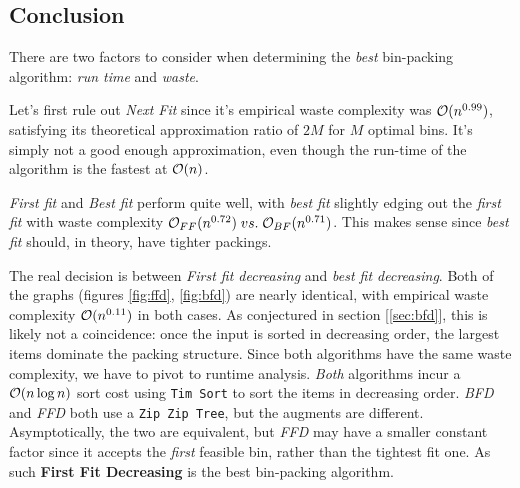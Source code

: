 \subsection{Conclusion}\label{sec:conc}

There are two factors to consider when determining the \emph{best} bin-packing
algorithm: \emph{run time} and \emph{waste}.

Let's first rule out \emph{Next Fit} since it's empirical waste complexity
was $\mathcal{O}(n^{0.99})$, satisfying its theoretical approximation ratio of $2M$ for
$M$ optimal bins. It's simply not a good enough approximation, even though the
run-time of the algorithm is the fastest at $\mathcal{O}(n)$.

\emph{First fit} and \emph{Best fit} perform quite well, with \emph{best fit}
slightly edging out the \emph{first fit} with waste complexity
$\mathcal{O}_{FF}(n^{0.72}) \; vs. \; \mathcal{O}_{BF}(n^{0.71})$. This makes sense since
\emph{best fit} should, in theory, have tighter packings.

The real decision is between \emph{First fit decreasing} and
\emph{best fit decreasing}. Both of the graphs (figures \ref{fig:ffd},
\ref{fig:bfd}) are nearly identical, with empirical waste complexity
$\mathcal{O}(n^{0.11})$ in both cases. As conjectured in section [\ref{sec:bfd}],
this is likely not a coincidence: once the input is sorted in decreasing
order, the largest items dominate the packing structure.
Since both algorithms have the same waste complexity, we have to pivot to
runtime analysis. \emph{Both} algorithms incur a $\mathcal{O}(n \log n)$ sort cost
using \texttt{Tim Sort} to sort the items in decreasing order. \emph{BFD} and
\emph{FFD} both use a \texttt{Zip Zip Tree}, but the augments are different.
Asymptotically, the two are equivalent, but \emph{FFD} may have a smaller constant
factor since it accepts the \emph{first} feasible bin, rather than the tightest fit one.
As such \textbf{First Fit Decreasing} is the best bin-packing algorithm.





